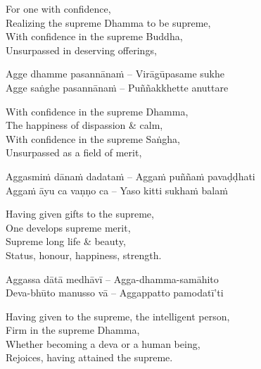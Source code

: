 \begin{english}
  For one with confidence,\\
  Realizing the supreme Dhamma to be supreme,\\
  With confidence in the supreme Buddha,\\
  Unsurpassed in deserving offerings,
\end{english}

\begin{twochants}
  Agge dhamme pasannānaṁ – Virāgūpasame sukhe\\
  Agge saṅghe pasannānaṁ – Puññakkhette anuttare
\end{twochants}

\begin{english}
  With confidence in the supreme Dhamma,\\
  The happiness of dispassion \& calm,\\
  With confidence in the supreme Saṅgha,\\
  Unsurpassed as a field of merit,
\end{english}

\begin{twochants}
  Aggasmiṁ dānaṁ dadataṁ – Aggaṁ puññaṁ pavaḍḍhati\\
  Aggaṁ āyu ca vaṇṇo ca – Yaso kitti sukhaṁ balaṁ
\end{twochants}

\begin{english}
  Having given gifts to the supreme,\\
  One develops supreme merit,\\
  Supreme long life \& beauty,\\
  Status, honour, happiness, strength.
\end{english}

\begin{twochants}
  Aggassa dātā medhāvī – Agga-dhamma-samāhito\\
  Deva-bhūto manusso vā – Aggappatto pamodatī'ti
\end{twochants}

\begin{english}
  Having given to the supreme, the intelligent person,\\
  Firm in the supreme Dhamma,\\
  Whether becoming a deva or a human being,\\
  Rejoices, having attained the supreme.
\end{english}

